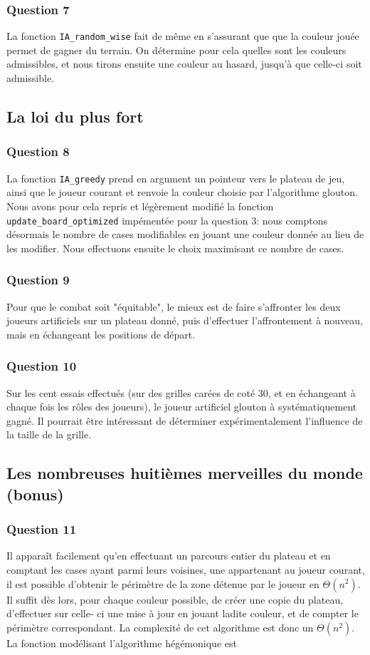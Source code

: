 \documentclass[12pt,a4paper,twoside]{article}
\begin{document}
\subsubsection*{Question 7}
\label{sec:orgheadline14}
La fonction \texttt{IA\_random\_wise} fait de même en s'assurant que
que la couleur jouée permet de gagner du terrain. On détermine pour
cela quelles sont les couleurs admissibles, et nous tirons ensuite
une couleur au hasard, jusqu'à que celle-ci soit admissible.
\subsection{La loi du plus fort}
\label{sec:orgheadline19}
\subsubsection*{Question 8}
\label{sec:orgheadline16}
La fonction \texttt{IA\_greedy} prend en argument un pointeur vers
le plateau de jeu, ainsi que le joueur courant et renvoie la couleur
choisie par l'algorithme glouton.  Nous avons pour cela repris et
légèrement modifié la fonction \texttt{update\_board\_optimized}
impémentée pour la question 3: nous comptons désormais le nombre de
cases modifiables en jouant une couleur donnée au lieu de les
modifier. Nous effectuons ensuite le choix maximisant ce nombre de
cases.
\subsubsection*{Question 9}
\label{sec:orgheadline17}
Pour que le combat soit "équitable", le mieux est de faire s'affronter
les deux joueurs artificiels sur un plateau donné, puis d'effectuer
l'affrontement à nouveau, mais en échangeant les positions de départ.
\subsubsection*{Question 10}
\label{sec:orgheadline18}
Sur les cent essais effectués (sur des grilles carées de coté 30, et
en échangeant à chaque fois les rôles des joueurs), le
joueur artificiel glouton à systématiquement gagné. 
Il pourrait être intéressant de déterminer expérimentalement
l'influence de la taille de la grille.
\subsection{Les nombreuses huitièmes merveilles du monde (bonus)}
\label{sec:orgheadline22}
\subsubsection*{Question 11}
\label{sec:orgheadline20}
Il apparaît facilement qu'en effectuant un parcours entier du plateau
et en comptant les cases ayant parmi leurs voisines, une appartenant au
joueur courant, il est possible d'obtenir le périmètre de la zone
détenue par le joueur en \(\Theta(n^{2})\). Il suffit dès lors, pour chaque
couleur possible, de créer une copie du plateau, d'effectuer sur celle-
ci une mise à jour en jouant ladite couleur, et de compter le
périmètre correspondant.
La complexité de cet algorithme est donc un \(\Theta(n^{2})\).
La fonction modélisant l'algorithme hégémonique est
\end{document}
